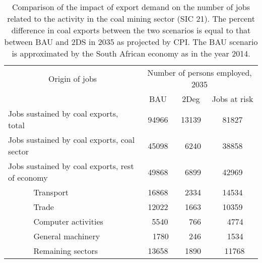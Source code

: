 \documentclass[12pt,english]{article}
\begin{document}
\begin{table}[!t]
	\centering
	\renewcommand*{\arraystretch}{1.15}
	\begin{tabular}{lp{20pt}lccc}
		\toprule
		\multicolumn{3}{c}{Origin of jobs} &\multicolumn{3}{c}{Number of persons employed, 2035} \\ 
		\multicolumn{3}{c}{} & BAU & 2Deg & Jobs at risk\\ 
		\midrule
		\multicolumn{3}{l}{Jobs sustained by coal exports, total}  		 & 94966 & 13139 & 81827 \\ 	
		\multicolumn{3}{l}{Jobs sustained by coal exports, coal sector}  & 45098 & \ 6240 & 38858 \\ 
		\multicolumn{3}{l}{Jobs sustained by coal exports, rest of economy}  & 49868  & \ 6899 & 42969\\ 
		& 						 & Transport & 16868 &  \  2334 & 14534\\ 
		& 						 & Trade & 12022 &  \ 1663  & 10359\\ 
		& 						 & Computer activities & \, 5540 & \, \, 766  & \ \,4774\\
		& 						 & General machinery & \ \,1780 &  \, \, 246 & \ \,1534 \\  
		& 						 & Remaining sectors & 13658 &  \, 1890 & \ 11768 \\  
		\bottomrule
	\end{tabular}
	\caption{\label{coalExport_BAUvs2DS_2035_table_employment}\small Comparison of the impact of export demand on the number of jobs related to the activity in the coal mining sector (SIC 21). The percent difference in coal exports between the two scenarios is equal to that between BAU and 2DS in 2035 as projected by CPI. The BAU scenario is approximated by the South African economy as in the year 2014.}
\end{table}
\end{document}
